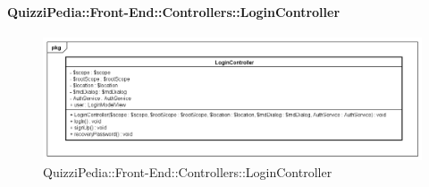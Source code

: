 \paragraph{QuizziPedia::Front-End::Controllers::LoginController}
\begin{figure} [ht]
	\centering
	\includegraphics[scale=0.45]{UML/Classi/Front-End/QuizziPedia_Front-end_Controller_LoginController.png}
	\caption{QuizziPedia::Front-End::Controllers::LoginController}
\end{figure} \FloatBarrier
